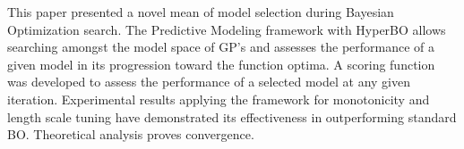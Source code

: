 This paper presented a novel mean of model selection during Bayesian Optimization search. The Predictive Modeling framework with HyperBO allows searching amongst the model space of GP's and assesses the performance of a given model in its progression toward the function optima. A scoring function was developed to assess the performance of a selected model at any given iteration. Experimental results applying the framework for monotonicity and length scale tuning have demonstrated its effectiveness in outperforming standard BO. Theoretical analysis proves convergence. \iffalse In addition applying model selection via HyperBO allows information about the black box function to be extracted during the optimization process. \fi
